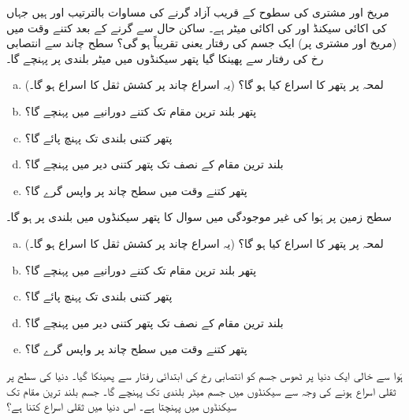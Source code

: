 مریخ اور مشتری کی سطوح کے قریب آزاد گرنے کی  مساوات بالترتیب  اور  ہیں جہاں  کی اکائی سیکنڈ اور  کی اکائی میٹر ہے۔ ساکن حال  سے گرنے کے   بعد  کتنے وقت میں (مریخ اور مشتری پر) ایک جسم کی رفتار  یعنی تقریباً  ہو گی؟
سطح چاند سے  انتصابی رخ  کی رفتار سے  پھینکا گیا پتھر  سیکنڈوں میں  میٹر بلندی پر پہنچے گا۔
\begin{enumerate}[a.]

\item
لمحہ  پر پتھر کا اسراع کیا ہو گا؟ (یہ اسراع چاند پر کشش ثقل کا اسراع ہو گا۔)
\item
پتھر بلند ترین مقام تک کتنے دورانیے میں پہنچے گا؟
\item
پتھر کتنی بلندی تک پہنچ پائے گا؟
\item
بلند ترین مقام کے  نصف تک پتھر کتنی دیر میں پہنچے گا؟
\item
پتھر  کتنے وقت میں سطح چاند پر واپس  گرے گا؟ 
\end{enumerate}   
سطح زمین پر ہَوا کی  غیر موجودگی میں سوال  کا پتھر  سیکنڈوں میں  بلندی پر ہو گا۔
\begin{enumerate}[a.]

\item
لمحہ  پر پتھر کا  اسراع کیا ہو گا؟ (یہ اسراع چاند پر کشش ثقل کا اسراع ہو گا۔)
\item
پتھر بلند ترین مقام تک کتنے دورانیے میں پہنچے گا؟
\item
پتھر کتنی بلندی تک پہنچ پائے گا؟
\item
بلند ترین مقام کے نصف تک پتھر کتنی دیر میں پہنچے گا؟
\item
پتھر  کتنے وقت میں سطح چاند پر واپس  گرے گا؟ 
\end{enumerate}   
ہَوا سے خالی ایک دنیا پر   ٹھوس جسم کو انتصابی رخ  کی ابتدائی رفتار سے پھینکا گیا۔  دنیا کی سطح پر ثقلی اسراع   ہونے کی وجہ سے  سیکنڈوں میں جسم   میٹر بلندی تک پہنچے گا۔ جسم بلند ترین مقام تک  سیکنڈوں میں پہنچتا ہے۔ اس دنیا میں ثقلی اسراع کتنا ہے؟
